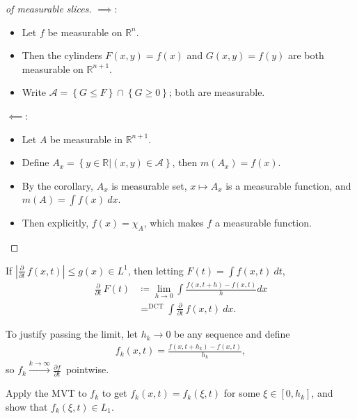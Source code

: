 \begin{proof}[of measurable slices]

\envlist

\(\implies\):

\begin{itemize}
\tightlist
\item
  Let \(f\) be measurable on \({\mathbb{R}}^n\).
\item
  Then the cylinders \(F(x, y) = f(x)\) and \(G(x, y) = f(y)\) are both
  measurable on \({\mathbb{R}}^{n+1}\).
\item
  Write
  \(\mathcal{A} = \left\{{G \leq F}\right\} \cap\left\{{G \geq 0}\right\}\);
  both are measurable.
\end{itemize}

\(\impliedby\):

\begin{itemize}
\tightlist
\item
  Let \(A\) be measurable in \({\mathbb{R}}^{n+1}\).
\item
  Define
  \(A_x = \left\{{y\in {\mathbb{R}}\mathrel{\Big|}(x, y) \in \mathcal{A}}\right\}\),
  then \(m(A_x) = f(x)\).
\item
  By the corollary, \(A_x\) is measurable set, \(x \mapsto A_x\) is a
  measurable function, and \(m(A) = \int f(x) ~dx\).
\item
  Then explicitly, \(f(x) = \chi_{A}\), which makes \(f\) a measurable
  function.
\end{itemize}

\end{proof}

\begin{proposition}

If
\({\left\lvert {{\frac{\partial }{\partial t}\,}f(x, t)} \right\rvert} \leq g(x) \in L^1\),
then letting \(F(t) = \int f(x, t) ~dt\),
\begin{align*}
{\frac{\partial }{\partial t}\,} F(t)
&\coloneqq\lim_{h \rightarrow 0} \int \frac{f(x, t+h)-f(x, t)}{h} d x \\
&\mathop{\mathrm{=}}^{\scriptstyle\text{DCT}} \int {\frac{\partial }{\partial t}\,} f(x, t) ~dx
.\end{align*}

To justify passing the limit, let \(h_k \to 0\) be any sequence and
define
\begin{align*}
f_k(x, t) = \frac{f(x, t+h_k)-f(x, t)}{h_k}
,\end{align*}
so
\(f_k \overset{k\to\infty}\longrightarrow{\frac{\partial f}{\partial t}\,}\)
pointwise.

Apply the MVT to \(f_k\) to get \(f_k(x, t) = f_k(\xi, t)\) for some
\(\xi \in [0, h_k]\), and show that \(f_k(\xi, t) \in L_1\).

\end{proposition}

